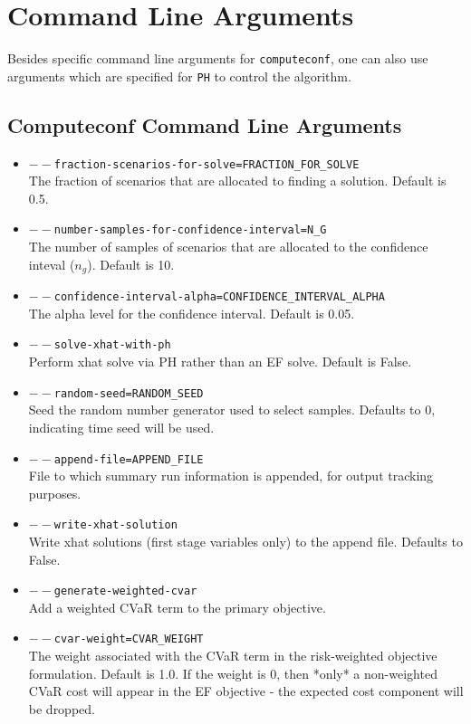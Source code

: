 \documentclass[a4paper]{article}
\begin{document}
\section{Command Line Arguments} \label{arguments}
Besides specific command line arguments for \texttt{computeconf}, one can also use arguments which are specified for \texttt{PH} to control the algorithm. 

\subsection{Computeconf Command Line Arguments} 

\begin{itemize}
	\item \texttt{$--$fraction-scenarios-for-solve=FRACTION\_FOR\_SOLVE}\\
	The fraction of scenarios that are allocated to finding a solution. Default is 0.5.
	\item \texttt{$--$number-samples-for-confidence-interval=N\_G}\\
	The number of samples of scenarios that are allocated to the confidence inteval ($n_g$). Default is 10.
	\item \texttt{$--$confidence-interval-alpha=CONFIDENCE\_INTERVAL\_ALPHA}\\
	The alpha level for the confidence interval. Default is 0.05.
	\item \texttt{$--$solve-xhat-with-ph}\\
	Perform xhat solve via PH rather than an EF solve. Default is False.
	\item \texttt{$--$random-seed=RANDOM\_SEED}\\
	Seed the random number generator used to select samples. Defaults to 0, indicating time seed will be used.
	\item \texttt{$--$append-file=APPEND\_FILE}\\
	File to which summary run information is appended, for output tracking purposes.
	\item \texttt{$--$write-xhat-solution}\\
	Write xhat solutions (first stage variables only) to the append file. Defaults to False.
	\item \texttt{$--$generate-weighted-cvar}\\
	Add a weighted CVaR term to the primary objective.
	\item \texttt{$--$cvar-weight=CVAR\_WEIGHT}\\
	The weight associated with the CVaR term in the risk-weighted objective formulation. Default is 1.0. If the weight is 0, then *only* a non-weighted CVaR cost will appear in the EF objective - the expected cost component will be dropped.

\end{itemize}
\end{document}
